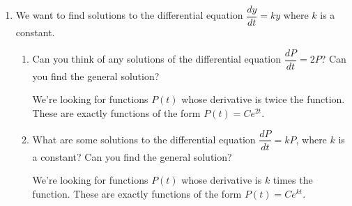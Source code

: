 \documentclass[main]{subfiles}
\begin{document}
\begin{enumerate}
\begin{enumerate}
  \item

    \begin{problem}[\vfill]
      Can you guess any more solutions of the differential equation? 
    \end{problem}

    \begin{solution}
      Two of the solutions we saw were $y(t)=e^t$ and $y(t)=7e^t$, so we might guess that any function of the form
      $y(t) = Ce^t$ where $C$ is a constant is a solution of the
      differential equation. 

      It's easy to check whether our guess is correct, so let's do that.
      If $y(t) = Ce^t$, the derivative $\frac{dy}{dt}$ is
      $Ce^t$, which is exactly what we want.
    \end{solution}

  \end{enumerate}
\item 
\begin{problem}[\vfill]
We want to find solutions to the differential equation $\dfrac{dy}{dt} = ky$ where $k$ is a constant.
\begin{enumerate}

  \item

    \begin{problem}[\vfill]
      Can you think of any solutions of the differential equation
      $\dfrac{dP}{dt} = 2P$?  Can you find the general solution?
    \end{problem}

    \begin{solution}
      We're looking for functions $P(t)$ whose derivative is twice the
      function.  These are exactly functions of the form $\boxed{P(t) = C
        e^{2t}}$.
    \end{solution}

    \item 
    \begin{problem}[\vfill]
        What are some solutions to the differential equation 
        $\dfrac{dP}{dt}=kP$, where $k$ is a constant? Can you find the
        general solution?
    \end{problem}

     \begin{solution}
      We're looking for functions $P(t)$ whose derivative is $k$ times the
      function.  These are exactly functions of the form $\boxed{P(t) = C
        e^{kt}}$.
    \end{solution}

      \end{enumerate}
\end{problem}



\end{enumerate}
\end{document}
